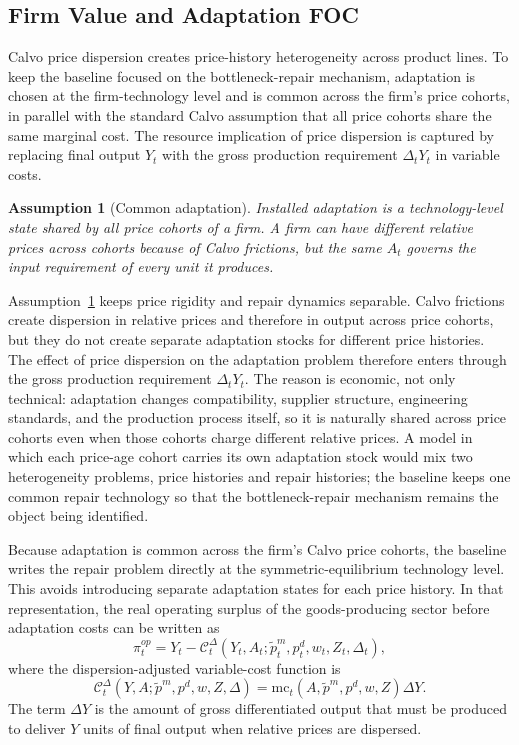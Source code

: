 ﻿\documentclass[12pt]{article}
\newtheorem{assumption}{Assumption}
\theoremstyle{remark}
\newcommand{\mc}{\mathrm{mc}}
\newcommand{\C}{\mathcal C}
\begin{document}
\subsection{Firm Value and Adaptation FOC}

Calvo price dispersion creates price-history heterogeneity across product lines. To keep the
baseline focused on the bottleneck-repair mechanism, adaptation is chosen at the firm-technology
level and is common across the firm's price cohorts, in parallel with the standard Calvo assumption
that all price cohorts share the same marginal cost. The resource implication of price dispersion
is captured by replacing final output $Y_t$ with the gross production requirement $\Delta_tY_t$ in
variable costs.

\begin{assumption}[Common adaptation]\label{ass:common_adaptation}
Installed adaptation is a technology-level state shared by all price cohorts of a firm. A firm can
have different relative prices across cohorts because of Calvo frictions, but the same
$A_t$ governs the input requirement of every unit it produces.
\end{assumption}

Assumption~\ref{ass:common_adaptation} keeps price rigidity and repair dynamics separable. Calvo
frictions create dispersion in relative prices and therefore in output across price cohorts, but
they do not create separate adaptation stocks for different price histories. The effect of price
dispersion on the adaptation problem therefore enters through the gross production requirement
$\Delta_tY_t$. The reason is economic, not only technical: adaptation changes compatibility,
supplier structure, engineering standards, and the production process itself, so it is naturally
shared across price cohorts even when those cohorts charge different relative prices. A model in
which each price-age cohort carries its own adaptation stock would mix two heterogeneity problems,
price histories and repair histories; the baseline keeps one common repair technology so that the
bottleneck-repair mechanism remains the object being identified.

Because adaptation is common across the firm's Calvo price cohorts, the baseline writes the repair
problem directly at the symmetric-equilibrium technology level. This avoids introducing separate
adaptation states for each price history. In that representation, the real operating surplus of
the goods-producing sector before adaptation costs can be written as
\begin{equation}
    \pi_t^{op}
    =
    Y_t
    -
    \C_t^\Delta(Y_t,A_t;\tilde p_t^m,p_t^d,w_t,Z_t,\Delta_t),
    \label{eq:operating_profit}
\end{equation}
where the dispersion-adjusted variable-cost function is
\begin{equation}
    \C_t^\Delta(Y,A;\tilde p^m,p^d,w,Z,\Delta)
    =
    \mc_t(A,\tilde p^m,p^d,w,Z)\Delta Y.
    \label{eq:cost_function}
\end{equation}
The term $\Delta Y$ is the amount of gross differentiated output that must be produced to deliver
$Y$ units of final output when relative prices are dispersed.
\end{document}
